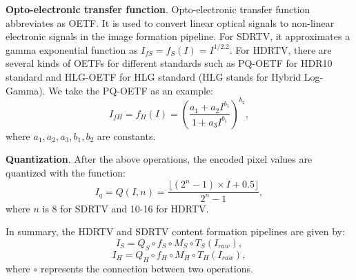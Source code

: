 \documentclass[10pt,twocolumn,letterpaper]{article}
\begin{document}
\textbf{Opto-electronic transfer function}. Opto-electronic transfer function abbreviates as OETF. It is used to convert linear optical signals to non-linear electronic signals in the image formation pipeline. For SDRTV, it approximates a gamma exponential function as $I_{fS}=f_{S}(I)=I^{1/2.2}$. For HDRTV, there are several kinds of OETFs for different standards such as PQ-OETF \cite{PQ} for HDR10 standard and HLG-OETF \cite{bt2100} for HLG standard (HLG stands for Hybrid Log-Gamma). We take the PQ-OETF as an example:
\begin{equation}
  I_{fH}=f_{H}(I)=(\frac{a_{1}+a_{2} I^{b_{1}}}{1+a_{3} I^{b_{1}}})^{b_{2}},
\end{equation}
where $a_{1}, a_{2}, a_{3}, b_{1}, b_{2}$ are constants. 

\textbf{Quantization}. After the above operations, the encoded pixel values are quantized with the function:
\begin{equation}
  I_{q}=Q(I,n)=\frac{\lfloor (2^{n}-1)\times I+0.5 \rfloor}{2^{n}-1},
\end{equation}
where $n$ is 8 for SDRTV and 10-16 for HDRTV.

In summary, the HDRTV and SDRTV content formation pipelines are given by:
\begin{equation}
   I_{S}=Q_{S}\circ f_{S}\circ M_{S}\circ T_{S}(I_{raw}),
\end{equation}
\begin{equation}
   I_{H}=Q_{H}\circ f_{H}\circ M_{H}\circ T_{H}(I_{raw}),
\end{equation}
where $\circ$ represents the connection between two operations. 
\end{document}
